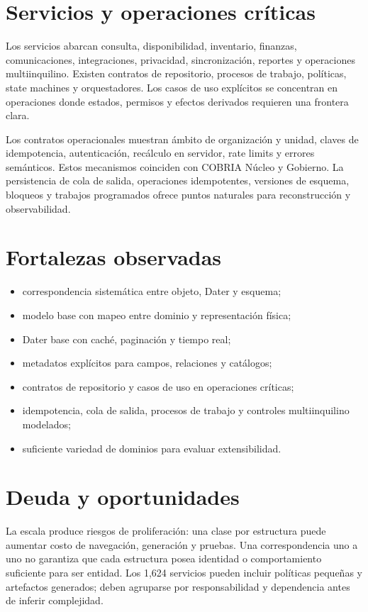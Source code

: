 \section{Servicios y operaciones críticas}

Los servicios abarcan consulta, disponibilidad, inventario, finanzas, comunicaciones,
integraciones, privacidad, sincronización, reportes y operaciones multiinquilino. Existen
contratos de repositorio, procesos de trabajo, políticas, state machines y orquestadores. Los casos de
uso explícitos se concentran en operaciones donde estados, permisos y efectos derivados
requieren una frontera clara.

Los contratos operacionales muestran ámbito de organización y unidad, claves de
idempotencia, autenticación, recálculo en servidor, rate limits y errores semánticos.
Estos mecanismos coinciden con COBRIA Núcleo y Gobierno. La persistencia de cola de salida,
operaciones idempotentes, versiones de esquema, bloqueos y trabajos programados ofrece
puntos naturales para reconstrucción y observabilidad.

\section{Fortalezas observadas}

\begin{itemize}[leftmargin=*]
  \item correspondencia sistemática entre objeto, Dater y esquema;
  \item modelo base con mapeo entre dominio y representación física;
  \item Dater base con caché, paginación y tiempo real;
  \item metadatos explícitos para campos, relaciones y catálogos;
  \item contratos de repositorio y casos de uso en operaciones críticas;
  \item idempotencia, cola de salida, procesos de trabajo y controles multiinquilino modelados;
  \item suficiente variedad de dominios para evaluar extensibilidad.
\end{itemize}

\section{Deuda y oportunidades}

La escala produce riesgos de proliferación: una clase por estructura puede aumentar
costo de navegación, generación y pruebas. Una correspondencia uno a uno no garantiza
que cada estructura posea identidad o comportamiento suficiente para ser entidad. Los
1,624 servicios pueden incluir políticas pequeñas y artefactos generados; deben
agruparse por responsabilidad y dependencia antes de inferir complejidad.

